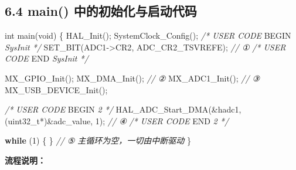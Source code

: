 \documentclass[
  chinese,
  UTF8,
  oneside,
  openany]{ctexbook}
\newenvironment{Shaded}{}{}
\newcommand{\CommentTok}[1]{\textcolor[rgb]{0.38,0.63,0.69}{\textit{#1}}}
\newcommand{\ControlFlowTok}[1]{\textcolor[rgb]{0.00,0.44,0.13}{\textbf{#1}}}
\newcommand{\DataTypeTok}[1]{\textcolor[rgb]{0.56,0.13,0.00}{#1}}
\newcommand{\DecValTok}[1]{\textcolor[rgb]{0.25,0.63,0.44}{#1}}
\newcommand{\NormalTok}[1]{#1}
\newcommand{\OperatorTok}[1]{\textcolor[rgb]{0.40,0.40,0.40}{#1}}
\newcommand{\RegionMarkerTok}[1]{#1}
\begin{document}
\subsection{6.4 main()
中的初始化与启动代码}\label{main-ux4e2dux7684ux521dux59cbux5316ux4e0eux542fux52a8ux4ee3ux7801}

\begin{Shaded}
\begin{Highlighting}[]
\DataTypeTok{int}\NormalTok{ main}\OperatorTok{(}\DataTypeTok{void}\OperatorTok{)}
\OperatorTok{\{}
\NormalTok{    HAL\_Init}\OperatorTok{();}
\NormalTok{    SystemClock\_Config}\OperatorTok{();}
    \CommentTok{/* USER CODE }\RegionMarkerTok{BEGIN}\CommentTok{ SysInit */}
\NormalTok{    SET\_BIT}\OperatorTok{(}\NormalTok{ADC1}\OperatorTok{{-}\textgreater{}}\NormalTok{CR2}\OperatorTok{,}\NormalTok{ ADC\_CR2\_TSVREFE}\OperatorTok{);}   \CommentTok{// ①}
    \CommentTok{/* USER CODE }\RegionMarkerTok{END}\CommentTok{ SysInit */}

\NormalTok{    MX\_GPIO\_Init}\OperatorTok{();}
\NormalTok{    MX\_DMA\_Init}\OperatorTok{();}       \CommentTok{// ②}
\NormalTok{    MX\_ADC1\_Init}\OperatorTok{();}      \CommentTok{// ③}
\NormalTok{    MX\_USB\_DEVICE\_Init}\OperatorTok{();}

    \CommentTok{/* USER CODE }\RegionMarkerTok{BEGIN}\CommentTok{ 2 */}
\NormalTok{    HAL\_ADC\_Start\_DMA}\OperatorTok{(\&}\NormalTok{hadc1}\OperatorTok{,} \OperatorTok{(}\DataTypeTok{uint32\_t}\OperatorTok{*)\&}\NormalTok{adc\_value}\OperatorTok{,} \DecValTok{1}\OperatorTok{);}  \CommentTok{// ④}
    \CommentTok{/* USER CODE }\RegionMarkerTok{END}\CommentTok{ 2 */}

    \ControlFlowTok{while} \OperatorTok{(}\DecValTok{1}\OperatorTok{)} \OperatorTok{\{} \OperatorTok{\}}  \CommentTok{// ⑤ 主循环为空，一切由中断驱动}
\OperatorTok{\}}
\end{Highlighting}
\end{Shaded}

\textbf{流程说明：}
\end{document}
